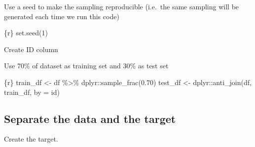 \documentclass[
  letterpaper,
  DIV=11,
  numbers=noendperiod,
  oneside]{scrreprt}
\newenvironment{Shaded}{\begin{snugshade}}{\end{snugshade}}
\newcommand{\AttributeTok}[1]{\textcolor[rgb]{0.40,0.45,0.13}{#1}}
\newcommand{\DecValTok}[1]{\textcolor[rgb]{0.68,0.00,0.00}{#1}}
\newcommand{\FloatTok}[1]{\textcolor[rgb]{0.68,0.00,0.00}{#1}}
\newcommand{\FunctionTok}[1]{\textcolor[rgb]{0.28,0.35,0.67}{#1}}
\newcommand{\InformationTok}[1]{\textcolor[rgb]{0.37,0.37,0.37}{#1}}
\newcommand{\NormalTok}[1]{\textcolor[rgb]{0.00,0.23,0.31}{#1}}
\newcommand{\OtherTok}[1]{\textcolor[rgb]{0.00,0.23,0.31}{#1}}
\newcommand{\SpecialCharTok}[1]{\textcolor[rgb]{0.37,0.37,0.37}{#1}}
\newcommand{\StringTok}[1]{\textcolor[rgb]{0.13,0.47,0.30}{#1}}
\begin{document}
Use a seed to make the sampling reproducible (i.e.~the same sampling
will be generated each time we run this code)

\begin{Shaded}
\begin{Highlighting}[]
\InformationTok{\textasciigrave{}\textasciigrave{}\textasciigrave{}\{r\}}
\FunctionTok{set.seed}\NormalTok{(}\DecValTok{1}\NormalTok{)}
\InformationTok{\textasciigrave{}\textasciigrave{}\textasciigrave{}}
\end{Highlighting}
\end{Shaded}

Create ID column

\begin{Shaded}
\end{Shaded}

Use 70\% of dataset as training set and 30\% as test set

\begin{Shaded}
\begin{Highlighting}[]
\InformationTok{\textasciigrave{}\textasciigrave{}\textasciigrave{}\{r\}}
\NormalTok{train\_df }\OtherTok{\textless{}{-}}\NormalTok{ df }\SpecialCharTok{\%\textgreater{}\%}
\NormalTok{  dplyr}\SpecialCharTok{::}\FunctionTok{sample\_frac}\NormalTok{(}\FloatTok{0.70}\NormalTok{)}
\NormalTok{test\_df  }\OtherTok{\textless{}{-}}\NormalTok{ dplyr}\SpecialCharTok{::}\FunctionTok{anti\_join}\NormalTok{(df,}
\NormalTok{                             train\_df,}
                             \AttributeTok{by =} \StringTok{\textquotesingle{}id\textquotesingle{}}\NormalTok{)}
\InformationTok{\textasciigrave{}\textasciigrave{}\textasciigrave{}}
\end{Highlighting}
\end{Shaded}

\hypertarget{separate-the-data-and-the-target}{%
\subsection{Separate the data and the
target}\label{separate-the-data-and-the-target}}

Create the target.
\end{document}
